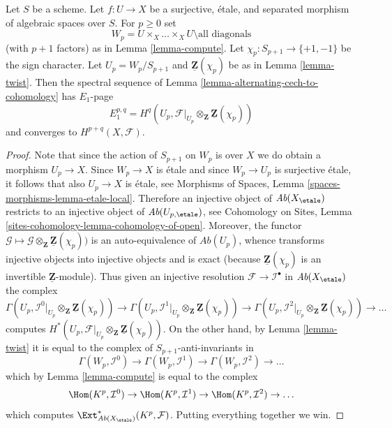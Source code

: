 \begin{lemma}
\label{lemma-alternating-spectral-sequence}
Let $S$ be a scheme. Let $f : U \to X$ be a surjective, \'etale, and
separated morphism of algebraic spaces over $S$. For $p \geq 0$ set
$$
W_p = U \times_X \ldots \times_X U \setminus \text{all diagonals}
$$
(with $p + 1$ factors) as in Lemma \ref{lemma-compute}.
Let $\chi_p : S_{p + 1} \to \{+1, -1\}$ be the sign character.
Let $U_p = W_p/S_{p + 1}$ and $\underline{\mathbf{Z}}(\chi_p)$ be as in
Lemma \ref{lemma-twist}.
Then the spectral sequence of
Lemma \ref{lemma-alternating-cech-to-cohomology}
has $E_1$-page
$$
E_1^{p, q} =
H^q(U_p, \mathcal{F}|_{U_p} \otimes_\mathbf{Z} \underline{\mathbf{Z}}(\chi_p))
$$
and converges to $H^{p + q}(X, \mathcal{F})$.
\end{lemma}

\begin{proof}
Note that since the action of $S_{p + 1}$ on $W_p$ is over $X$ we do
obtain a morphism $U_p \to X$. Since $W_p \to X$ is \'etale and since
$W_p \to U_p$ is surjective \'etale, it follows
that also $U_p \to X$ is \'etale, see
Morphisms of Spaces, Lemma \ref{spaces-morphisms-lemma-etale-local}.
Therefore an injective object of
$\textit{Ab}(X_\etale)$ restricts to an injective object of
$\textit{Ab}(U_{p, \etale})$, see
Cohomology on Sites, Lemma \ref{sites-cohomology-lemma-cohomology-of-open}.
Moreover, the functor
$\mathcal{G} \mapsto
\mathcal{G} \otimes_\mathbf{Z} \underline{\mathbf{Z}}(\chi_p))$
is an auto-equivalence of $\textit{Ab}(U_p)$, whence transforms injective
objects into injective objects and is exact (because
$\underline{\mathbf{Z}}(\chi_p)$ is an invertible
$\underline{\mathbf{Z}}$-module). Thus given an injective resolution
$\mathcal{F} \to \mathcal{I}^\bullet$ in $\textit{Ab}(X_\etale)$
the complex
$$
\Gamma(U_p,
\mathcal{I}^0|_{U_p} \otimes_\mathbf{Z} \underline{\mathbf{Z}}(\chi_p))
\to
\Gamma(U_p,
\mathcal{I}^1|_{U_p} \otimes_\mathbf{Z} \underline{\mathbf{Z}}(\chi_p))
\to
\Gamma(U_p,
\mathcal{I}^2|_{U_p} \otimes_\mathbf{Z} \underline{\mathbf{Z}}(\chi_p))
\to \ldots
$$
computes
$H^*(U_p,
\mathcal{F}|_{U_p} \otimes_\mathbf{Z} \underline{\mathbf{Z}}(\chi_p))$.
On the other hand, by
Lemma \ref{lemma-twist}
it is equal to the complex of $S_{p + 1}$-anti-invariants in
$$
\Gamma(W_p, \mathcal{I}^0) \to
\Gamma(W_p, \mathcal{I}^1) \to
\Gamma(W_p, \mathcal{I}^2) \to \ldots
$$
which by
Lemma \ref{lemma-compute}
is equal to the complex
$$
\Hom(K^p, \mathcal{I}^0) \to
\Hom(K^p, \mathcal{I}^1) \to
\Hom(K^p, \mathcal{I}^2) \to \ldots
$$
which computes
$\Ext^*_{\textit{Ab}(X_\etale)}(K^p, \mathcal{F})$.
Putting everything together we win.
\end{proof}